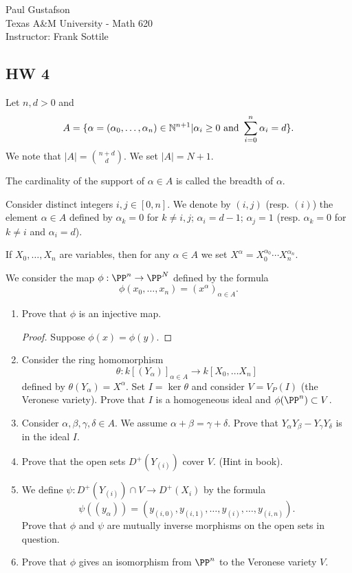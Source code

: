 \documentclass{article}
\begin{document}
\noindent Paul Gustafson\\
\noindent Texas A\&M University - Math 620\\ 
\noindent Instructor: Frank Sottile

\subsection*{HW 4}
 Let  $n, d > 0$ and 
$$ A = \{\alpha = (\alpha_0, \ldots, \alpha_n) \in \mathbb{N}^{n+1} | \alpha_i \ge 0 \text{ and } \sum_{i=0}^n \alpha_i = d \}.$$
We note that $|A| = {{n+d} \choose d }$. We set $|A| = N + 1$.

The cardinality of the support of $\alpha \in A$ is called the breadth of $\alpha$.

Consider distinct integers $i,j \in [0,n]$. We denote by $(i,j)$ (resp. $(i)$) the element $\alpha \in A$ defined by $\alpha_k = 0$ for $k \neq i,j$; $\alpha_i = d- 1$; $\alpha_j = 1$ (resp. $\alpha_k = 0$ for $k \neq i$ and $\alpha_i = d$).

If $X_0, \ldots, X_n$ are variables, then for any $\alpha \in A$ we set $X^\alpha = X_0^{\alpha_0} \cdots X_n^{\alpha_n}$.

We consider the map $\phi : \PP^n \to \PP^N$ defined by the formula
$$\phi(x_0, \ldots, x_n) = (x^\alpha)_{\alpha \in A}.$$
\begin{enumerate}[1)]
\item Prove that $\phi$ is an injective map.
\begin{proof}
Suppose $\phi(x) = \phi(y)$.
\end{proof}

\item Consider the ring homomorphism
$$\theta : k[(Y_\alpha)]_{\alpha \in A} \to k[X_0, \ldots X_n]$$
defined by $\theta(Y_\alpha) = X^\alpha$. Set $I = \ker \theta$ and consider $V = V_P(I)$ (the Veronese variety).
Prove that $I$ is a homogeneous ideal and $\phi(\PP^n) \subset V$.
\item Consider $\alpha, \beta, \gamma, \delta \in A$. We assume $\alpha + \beta = \gamma + \delta$. Prove that $Y_\alpha Y_\beta - Y_\gamma Y_\delta$ is in the ideal $I$.
\item Prove that the open sets $D^+(Y_{(i)})$ cover $V$. (Hint in book).
\item We define $\psi : D^+(Y_{(i)}) \cap V \to D^+(X_i)$ by the formula
$$\psi((y_\alpha)) = (y_{(i,0)}, y_{(i,1)}, \ldots, y_{(i)}, \ldots, y_{(i,n)}).$$
Prove that $\phi$ and $\psi$ are mutually inverse morphisms on the open sets in question.
\item Prove that $\phi$ gives an isomorphism from $\PP^n$ to the Veronese variety $V$.
\end{enumerate}
\end{document}
